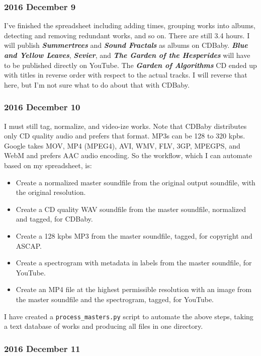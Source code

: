 \documentclass[english,11pt,letterpaper,onecolumn]{scrartcl}
\begin{document}
\subsubsection{2016 December 9}

I've finished the spreadsheet including adding times, grouping works into albums, detecting and removing redundant works, and so on. There are still 3.4 hours. I will publish \emph{\textbf{Summertrees}} and \emph{\textbf{Sound Fractals}} as albums on CDBaby. \emph{\textbf{Blue and Yellow Leaves}}, \emph{\textbf{Sevier}}, and \emph{\textbf{The Garden of the Hesperides}} will have to be published directly on YouTube. The \emph{\textbf{Garden of Algorithms}} CD ended up with titles in reverse order with respect to the actual tracks. I will reverse that here, but I'm not sure what to do about that with CDBaby.

\subsubsection*{2016 December 10}

I must still tag, normalize, and video-ize works. Note that CDBaby distributes only CD quality audio and prefers that format. MP3s can be 128 to 320 kpbs. Google takes MOV, MP4 (MPEG4), AVI, WMV, FLV, 3GP, MPEGPS, and WebM and prefers AAC audio encoding. So the workflow, which I can automate based on my spreadsheet, is:

\begin{itemize}
	\item Create a normalized master soundfile from the original output soundfile, with the original resolution.
	\item Create a CD quality WAV soundfile from the master soundfile, normalized and tagged, for CDBaby. 
	\item Create a 128 kpbs MP3 from the master soundfile, tagged, for copyright and ASCAP.
	\item Create a spectrogram with metadata in labels from the master soundfile, for YouTube.
	\item Create an MP4 file at the highest permissible resolution with an image from the master soundfile and the spectrogram, tagged, for YouTube.
\end{itemize}

\noindent I have created a \texttt{process\_masters.py} script to automate the above steps, taking a text database of works and producing all files in one directory.

\subsubsection*{2016 December 11}
\end{document}

